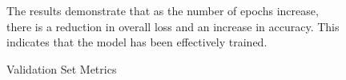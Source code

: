 \begin{figure}[h]
    \qquad
    \caption{Validation Set Metrics}
    
    The results demonstrate that as the number of epochs increase, there is a reduction in overall loss and an increase in accuracy. This indicates that the model has been effectively trained.
\end{figure}

    

